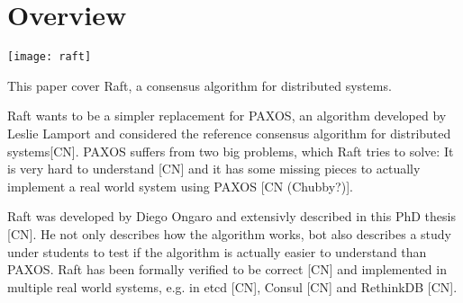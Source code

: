 




\begin{titlepage}
\afterpage{\restorepagecolor}
\newcommand{\colorRule}[3][black]{\textcolor[HTML]{#1}{\rule{#2}{#3}}}
\end{titlepage}
\restoregeometry



{
\hypersetup{linkcolor=}
\setcounter{tocdepth}{2}
\tableofcontents
\pagebreak
}


















\section{Overview}\label{overview}

\texttt{[image: raft]}

This paper cover Raft, a consensus algorithm for distributed systems.

Raft wants to be a simpler replacement for PAXOS, an algorithm developed by Leslie Lamport and considered the reference consensus algorithm for distributed systems[CN]. PAXOS suffers from two big problems, which Raft tries to solve: It is very hard to understand [CN] and it has some missing pieces to actually implement a real world system using PAXOS [CN (Chubby?)].

Raft was developed by Diego Ongaro and extensivly described in this PhD thesis [CN]. He not only describes how the algorithm works, bot also describes a study under students to test if the algorithm is actually easier to understand than PAXOS. Raft has been formally verified to be correct [CN] and implemented in multiple real world systems, e.g. in etcd [CN], Consul [CN] and RethinkDB [CN].


